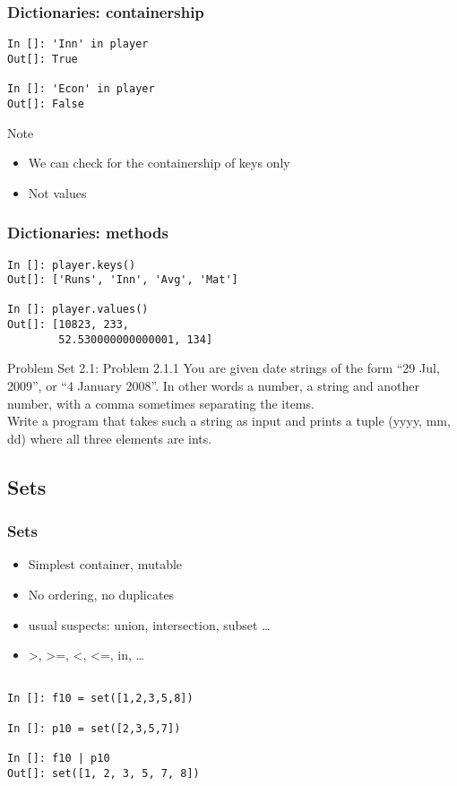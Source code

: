 \documentclass[14pt,compress]{beamer}
\newcounter{time}
\begin{document}
\begin{frame}[fragile]
  \frametitle{Dictionaries: containership}
  \begin{lstlisting}
In []: 'Inn' in player
Out[]: True

In []: 'Econ' in player
Out[]: False
  \end{lstlisting}
  \begin{block}{Note}
    \begin{itemize}
      \item We can check for the containership of keys only
      \item Not values
    \end{itemize}
  \end{block}
\end{frame}

\begin{frame}[fragile]
  \frametitle{Dictionaries: methods}
  \begin{lstlisting}
In []: player.keys()
Out[]: ['Runs', 'Inn', 'Avg', 'Mat']

In []: player.values()
Out[]: [10823, 233, 
        52.530000000000001, 134]
  \end{lstlisting}
\end{frame}

\begin{frame} {Problem Set 2.1: Problem 2.1.1}
You are given date strings of the form ``29 Jul, 2009'', or ``4 January 2008''. In other words a number, a string and another number, with a comma sometimes separating the items.\\Write a program that takes such a string as input and prints a tuple (yyyy, mm, dd) where all three elements are ints.
\end{frame}

\subsection{Sets}
\begin{frame}[fragile]
  \frametitle{Sets}
    \begin{itemize}
      \item Simplest container, mutable
      \item No ordering, no duplicates
      \item usual suspects: union, intersection, subset \ldots
      \item >, >=, <, <=, in, \ldots
    \end{itemize}
    \begin{lstlisting}

In []: f10 = set([1,2,3,5,8])

In []: p10 = set([2,3,5,7])

In []: f10 | p10
Out[]: set([1, 2, 3, 5, 7, 8])
\end{lstlisting}
\end{frame}
\end{document}
